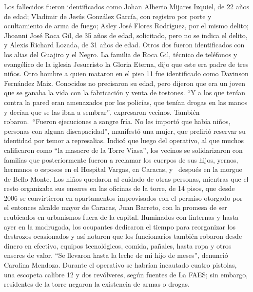 \documentclass{article}%
\begin{document}
\newline%
%
Los fallecidos fueron identificados como Johan Alberto Mijares Izquiel, de 22 años de edad; Vladimir de Jesús González García, con registro por porte y ocultamiento de arma de fuego; Asley José Flores Rodríguez, por el mismo delito; Jhoanni José Roca Gil, de 35 años de edad, solicitado, pero no se indica el delito, y Alexis Richard Lozada, de 31 años de edad. Otros dos fueron identificados con los alias del Guajiro y el Negro. La familia de Roca Gil, técnico de teléfonos y evangélico de la iglesia Jesucristo la Gloria Eterna, dijo que este era padre de tres niños.%
\newline%
%
Otro hombre a quien mataron en el piso 11 fue identificado como Davinson Fernández Maiz. Conocidos no precisaron su edad, pero dijeron que era un joven que se ganaba la vida con la fabricación y venta de tostones. “Y a los que tenían contra la pared eran amenazados por los policías, que tenían drogas en las manos y decían que se las iban a sembrar”, expresaron vecinos.%
\newline%
%
También robaron.~“Fueron ejecuciones a sangre fría. No les importó que había niños, personas con alguna discapacidad”, manifestó una mujer, que prefirió reservar su identidad por temor a represalias. Indicó que luego del operativo, al que muchos calificaron como “la masacre de la Torre Viasa”, los vecinos se solidarizaron con familias que posteriormente fueron a reclamar los cuerpos de sus hijos, yernos, hermanos o esposos en el Hospital Vargas, en Caracas, y ~después en la morgue de Bello Monte.%
\newline%
%
Los niños quedaron al cuidado de otras personas, mientras que el resto organizaba sus enseres en las oficinas de la torre, de 14 pisos, que desde 2006 se convirtieron en apartamentos improvisados con el permiso otorgado por el entonces alcalde mayor de Caracas, Juan Barreto, con la promesa de ser reubicados en urbanismos fuera de la capital.%
\newline%
%
Iluminados con linternas y hasta ayer en la madrugada, los ocupantes dedicaron el tiempo para reorganizar los destrozos ocasionados y así notaron que los funcionarios también robaron desde dinero en efectivo, equipos tecnológicos, comida, pañales, hasta ropa y otros enseres de valor. “Se llevaron hasta la leche de mi hijo de meses”, denunció Carolina Mendoza.%
\newline%
%
Durante el operativo se habrían incautado cuatro pistolas, una escopeta calibre 12 y dos revólveres, según fuentes de La FAES; sin embargo, residentes de la torre negaron la existencia de armas o drogas.%
\newline%
%
\end{document}
